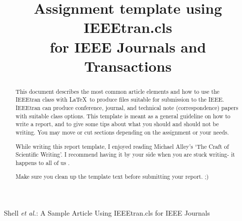 \documentclass[conference]{IEEEtran}
\begin{document}
\title{Assignment template using IEEEtran.cls\\ for IEEE Journals and Transactions}

\author{
	\and
	\and
}

%
{Shell \MakeLowercase{\textit{et al.}}: A Sample Article Using IEEEtran.cls for IEEE Journals}


\maketitle

\begin{abstract}
	This document describes the most common article elements and how to use the IEEEtran class with \LaTeX \ to produce files suitable for submission to the IEEE.  IEEEtran can produce conference, journal, and technical note (correspondence) papers with suitable class options.
	This template is meant as a general guideline on how to write a report, and to give some tips about what you should and should not be writing. You may move or cut sections depending on the assignment or your needs.

	While writing this report template, I enjoyed reading Michael Alley's `The Craft of Scientific Writing'. I recommend having it by your side when you are stuck writing- it happens to all of us \cite{AlleyMichael2018TCoS}.

	\bigskip

	Make sure you clean up the template text before submitting your report. ;)
\end{abstract}
\end{document}
